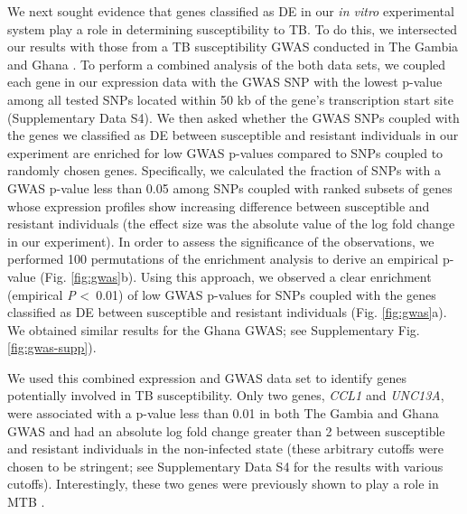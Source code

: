 \documentclass[fleqn,10pt]{wlscirep}
\begin{document}
We next sought evidence that genes classified as DE in our \emph{in
vitro} experimental system play a role in determining susceptibility
to TB. To do this, we intersected our results with those from a TB
susceptibility GWAS conducted in The Gambia and Ghana \cite{Thye2010}.
To perform a combined analysis of the both data sets, we coupled each
gene in our expression data with the GWAS SNP with the lowest p-value
among all tested SNPs located within 50 kb of the gene’s transcription
start site (Supplementary Data S4). We then asked whether the GWAS
SNPs coupled with the genes we classified as DE between susceptible
and resistant individuals in our experiment are enriched for low GWAS
p-values compared to SNPs coupled to randomly chosen genes.
Specifically, we calculated the fraction of SNPs with a GWAS p-value
less than 0.05 among SNPs coupled with ranked subsets of genes whose
expression profiles show increasing difference between susceptible and
resistant individuals (the effect size was the absolute value of the
log fold change in our experiment). In order to assess the
significance of the observations, we performed 100 permutations of the
enrichment analysis to derive an empirical p-value (Fig.
\ref{fig:gwas}b). Using this approach, we observed a clear enrichment
(empirical \emph{P} \textless \, 0.01) of low GWAS p-values for SNPs
coupled with the genes classified as DE between susceptible and
resistant individuals (Fig. \ref{fig:gwas}a). We obtained similar
results for the Ghana GWAS; see Supplementary Fig.
\ref{fig:gwas-supp}).

We used this combined expression and GWAS data set to identify genes
potentially involved in TB susceptibility. Only two genes, \emph{CCL1}
and \emph{UNC13A}, were associated with a p-value less than 0.01 in
both The Gambia and Ghana GWAS and had an absolute log fold change
greater than 2 between susceptible and resistant individuals in the
non-infected state (these arbitrary cutoffs were chosen to be
stringent; see Supplementary Data S4 for the results with various
cutoffs). Interestingly, these two genes were previously shown to play
a role in MTB .
\end{document}

